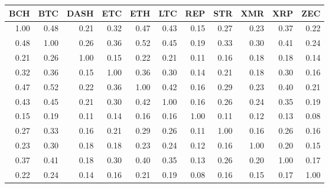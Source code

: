 \begin{tabular}{rrrrrrrrrrr}
  \toprule
BCH & BTC & DASH & ETC & ETH & LTC & REP & STR & XMR & XRP & ZEC \\ 
  \midrule
1.00 & 0.48 & 0.21 & 0.32 & 0.47 & 0.43 & 0.15 & 0.27 & 0.23 & 0.37 & 0.22 \\ 
  0.48 & 1.00 & 0.26 & 0.36 & 0.52 & 0.45 & 0.19 & 0.33 & 0.30 & 0.41 & 0.24 \\ 
  0.21 & 0.26 & 1.00 & 0.15 & 0.22 & 0.21 & 0.11 & 0.16 & 0.18 & 0.18 & 0.14 \\ 
  0.32 & 0.36 & 0.15 & 1.00 & 0.36 & 0.30 & 0.14 & 0.21 & 0.18 & 0.30 & 0.16 \\ 
  0.47 & 0.52 & 0.22 & 0.36 & 1.00 & 0.42 & 0.16 & 0.29 & 0.23 & 0.40 & 0.21 \\ 
  0.43 & 0.45 & 0.21 & 0.30 & 0.42 & 1.00 & 0.16 & 0.26 & 0.24 & 0.35 & 0.19 \\ 
  0.15 & 0.19 & 0.11 & 0.14 & 0.16 & 0.16 & 1.00 & 0.11 & 0.12 & 0.13 & 0.08 \\ 
  0.27 & 0.33 & 0.16 & 0.21 & 0.29 & 0.26 & 0.11 & 1.00 & 0.16 & 0.26 & 0.16 \\ 
  0.23 & 0.30 & 0.18 & 0.18 & 0.23 & 0.24 & 0.12 & 0.16 & 1.00 & 0.20 & 0.15 \\ 
  0.37 & 0.41 & 0.18 & 0.30 & 0.40 & 0.35 & 0.13 & 0.26 & 0.20 & 1.00 & 0.17 \\ 
  0.22 & 0.24 & 0.14 & 0.16 & 0.21 & 0.19 & 0.08 & 0.16 & 0.15 & 0.17 & 1.00 \\ 
   \bottomrule
\end{tabular}
